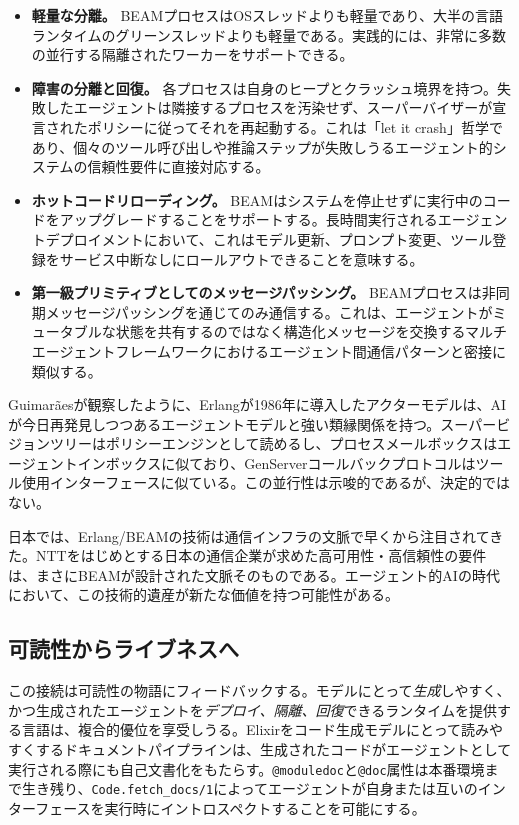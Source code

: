 \documentclass[11pt]{article}
\newcommand{\elixir}{Elixir}
\begin{document}
\begin{itemize}
  \item \textbf{軽量な分離。} BEAMプロセスはOSスレッドよりも軽量であり、大半の言語ランタイムのグリーンスレッドよりも軽量である。実践的には、非常に多数の並行する隔離されたワーカーをサポートできる。
  \item \textbf{障害の分離と回復。} 各プロセスは自身のヒープとクラッシュ境界を持つ。失敗したエージェントは隣接するプロセスを汚染せず、スーパーバイザーが宣言されたポリシーに従ってそれを再起動する。これは「let it crash」哲学であり、個々のツール呼び出しや推論ステップが失敗しうるエージェント的システムの信頼性要件に直接対応する。
  \item \textbf{ホットコードリローディング。} BEAMはシステムを停止せずに実行中のコードをアップグレードすることをサポートする。長時間実行されるエージェントデプロイメントにおいて、これはモデル更新、プロンプト変更、ツール登録をサービス中断なしにロールアウトできることを意味する。
  \item \textbf{第一級プリミティブとしてのメッセージパッシング。} BEAMプロセスは非同期メッセージパッシングを通じてのみ通信する。これは、エージェントがミュータブルな状態を共有するのではなく構造化メッセージを交換するマルチエージェントフレームワークにおけるエージェント間通信パターンと密接に類似する。
\end{itemize}

Guimarãesが観察したように、Erlangが1986年に導入したアクターモデルは、AIが今日再発見しつつあるエージェントモデルと強い類縁関係を持つ\cite{guimaraes}。スーパービジョンツリーはポリシーエンジンとして読めるし、プロセスメールボックスはエージェントインボックスに似ており、GenServerコールバックプロトコルはツール使用インターフェースに似ている。この並行性は示唆的であるが、決定的ではない。

日本では、Erlang/BEAMの技術は通信インフラの文脈で早くから注目されてきた。NTTをはじめとする日本の通信企業が求めた高可用性・高信頼性の要件は、まさにBEAMが設計された文脈そのものである。エージェント的AIの時代において、この技術的遺産が新たな価値を持つ可能性がある。

\subsection{可読性からライブネスへ}

この接続は可読性の物語にフィードバックする。モデルにとって\emph{生成}しやすく、かつ生成されたエージェントを\emph{デプロイ、隔離、回復}できるランタイムを提供する言語は、複合的優位を享受しうる。\elixir{}をコード生成モデルにとって読みやすくするドキュメントパイプラインは、生成されたコードがエージェントとして実行される際にも自己文書化をもたらす。\texttt{@moduledoc}と\texttt{@doc}属性は本番環境まで生き残り、\texttt{Code.fetch\_docs/1}によってエージェントが自身または互いのインターフェースを実行時にイントロスペクトすることを可能にする\cite{codefetchdocs}。
\end{document}
